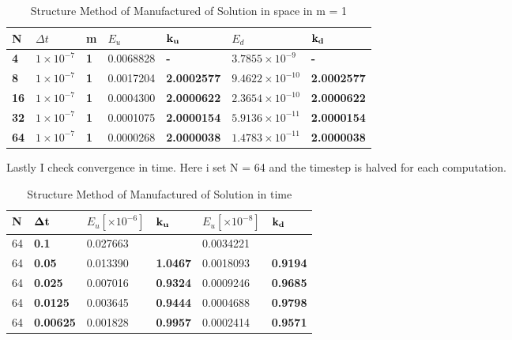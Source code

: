 \begin{table}[H]
\centering
\caption{Structure Method of Manufactured of Solution in space in m = 1}
\label{my-label}
\begin{tabular}{|l|l|l|l|l|l|l|}
\hline
\textbf{N} & $\Delta t$ & \textbf{m} & $E_u $ & $\bold{k_u}$ & $E_d $ & $\bold{k_d}$ \\ \hline
\textbf{4} & $1\times10^{-7}$ & \textbf{1} & 0.0068828 & \textbf{-} & $3.7855 \times 10^{-9} $ & \textbf{-} \\ \hline
\textbf{8} & $1\times10^{-7}$ & \textbf{1} & 0.0017204 & \textbf{2.0002577} & $9.4622 \times 10^{-10} $ & \textbf{2.0002577} \\ \hline
\textbf{16} & $1\times10^{-7}$ & \textbf{1} & 0.0004300 & \textbf{2.0000622} & $2.3654 \times 10^{-10} $ & \textbf{2.0000622} \\ \hline
\textbf{32} & $1\times10^{-7}$ & \textbf{1} & 0.0001075 & \textbf{2.0000154} & $5.9136 \times 10^{-11} $ & \textbf{2.0000154} \\ \hline
\textbf{64} & $1\times10^{-7}$ & \textbf{1} & 0.0000268 & \textbf{2.0000038} & $1.4783 \times 10^{-11} $ & \textbf{2.0000038} \\ \hline
\end{tabular}
\end{table}

Lastly I check convergence in time. Here i set N = 64 and the timestep is halved for each computation.

\begin{table}[H]
\centering
\caption{Structure Method of Manufactured of Solution in time}
\label{my-label}
\begin{tabular}{|l|l|l|l|l|l|}
\hline
N & $\bold{\Delta t}$ & $E_u [\times10^{-6}]$ & $\bold{k_u}$ & $E_u [\times10^{-8}]$ & $\bold{k_d}$ \\ \hline
64 & \textbf{0.1} & 0.027663 & \textbf{} & 0.0034221 & \textbf{} \\ \hline
64 & \textbf{0.05} & 0.013390 & \textbf{1.0467} & 0.0018093 & \textbf{0.9194} \\ \hline
64 & \textbf{0.025} & 0.007016 & \textbf{0.9324} & 0.0009246 & \textbf{0.9685} \\ \hline
64 & \textbf{0.0125} & 0.003645 & \textbf{0.9444} & 0.0004688 & \textbf{0.9798} \\ \hline
64 & \textbf{0.00625} & 0.001828 & \textbf{0.9957} & 0.0002414 & \textbf{0.9571} \\ \hline
\end{tabular}
\end{table}


